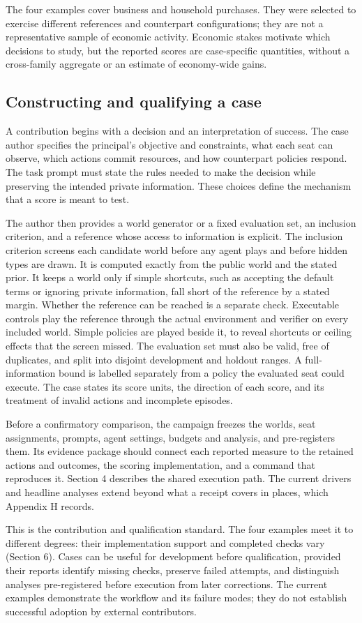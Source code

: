 The four examples cover business and household purchases. They were
selected to exercise different references and counterpart configurations;
they are not a representative sample of economic activity. Economic
stakes motivate which decisions to study, but the reported scores are
case-specific quantities, without a cross-family aggregate or an estimate
of economy-wide gains.

\subsection{Constructing and qualifying a case}
\label{sec:case-construction}

A contribution begins with a decision and an interpretation of success.
The case author specifies the principal's objective and constraints, what each
seat can observe, which actions commit resources, and how counterpart
policies respond. The task prompt must state the rules needed to make the
decision while preserving the intended private information. These
choices define the mechanism that a score is meant to test.

The author then provides a world generator or a fixed evaluation set, an inclusion
criterion, and a reference whose access to information is explicit. The inclusion criterion
screens each candidate world before any agent plays and before hidden
types are drawn. It is computed exactly from the public world and the stated
prior. It keeps a world only if simple shortcuts, such as accepting the
default terms or ignoring private information, fall short of the reference
by a stated margin. Whether the reference can be reached is a separate
check. Executable controls play the reference through the actual environment and
verifier on every included world. Simple policies are played beside it, to reveal
shortcuts or ceiling effects that the screen missed. The evaluation set must also be
valid, free of duplicates, and split into disjoint development and holdout
ranges. A full-information bound is labelled separately from a policy
the evaluated seat could execute. The case states its score units,
the direction of each score, and its treatment of invalid actions and incomplete episodes.

Before a confirmatory comparison, the campaign freezes the worlds,
seat assignments, prompts, agent settings, budgets and analysis, and pre-registers them. Its
evidence package should connect each reported measure to the retained
actions and outcomes, the scoring implementation, and a command that
reproduces it. Section 4 describes the shared execution path. The current drivers
and headline analyses extend beyond what a receipt covers in places, which
Appendix H records.

This is the contribution and qualification standard. The four examples meet it
to different degrees: their implementation support and completed checks vary
(Section 6). Cases can be useful for development before
qualification, provided their reports identify missing checks, preserve
failed attempts, and distinguish analyses pre-registered before execution from
later corrections. The current examples demonstrate the workflow and
its failure modes; they do not establish successful adoption by external
contributors.
